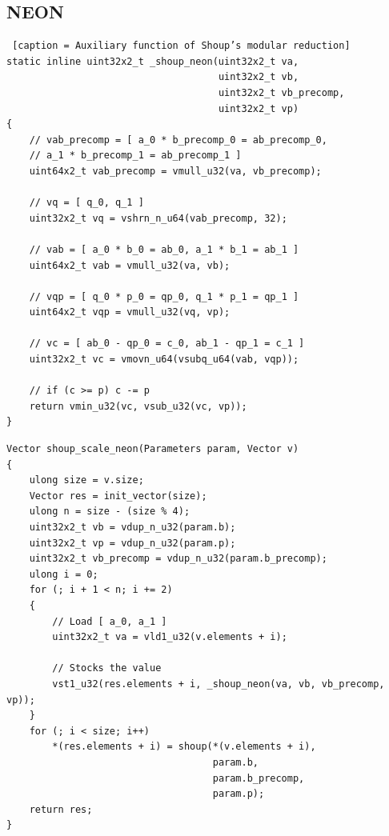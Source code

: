 \documentclass{article}
\begin{document}
\subsection{NEON}
\begin{lstlisting} [caption = Auxiliary function of Shoup’s modular reduction]
static inline uint32x2_t _shoup_neon(uint32x2_t va,
                                     uint32x2_t vb,
                                     uint32x2_t vb_precomp,
                                     uint32x2_t vp)
{
    // vab_precomp = [ a_0 * b_precomp_0 = ab_precomp_0,
    // a_1 * b_precomp_1 = ab_precomp_1 ]
    uint64x2_t vab_precomp = vmull_u32(va, vb_precomp);

    // vq = [ q_0, q_1 ]
    uint32x2_t vq = vshrn_n_u64(vab_precomp, 32);

    // vab = [ a_0 * b_0 = ab_0, a_1 * b_1 = ab_1 ]
    uint64x2_t vab = vmull_u32(va, vb);

    // vqp = [ q_0 * p_0 = qp_0, q_1 * p_1 = qp_1 ]
    uint64x2_t vqp = vmull_u32(vq, vp);

    // vc = [ ab_0 - qp_0 = c_0, ab_1 - qp_1 = c_1 ]
    uint32x2_t vc = vmovn_u64(vsubq_u64(vab, vqp));

    // if (c >= p) c -= p
    return vmin_u32(vc, vsub_u32(vc, vp));
}
\end{lstlisting}
\begin{lstlisting}[caption = NEON Implementation of Shoup’s Modular Reduction]
Vector shoup_scale_neon(Parameters param, Vector v)
{
    ulong size = v.size;
    Vector res = init_vector(size);
    ulong n = size - (size % 4);
    uint32x2_t vb = vdup_n_u32(param.b);
    uint32x2_t vp = vdup_n_u32(param.p);
    uint32x2_t vb_precomp = vdup_n_u32(param.b_precomp);
    ulong i = 0;
    for (; i + 1 < n; i += 2)
    {
        // Load [ a_0, a_1 ]
        uint32x2_t va = vld1_u32(v.elements + i);

        // Stocks the value
        vst1_u32(res.elements + i, _shoup_neon(va, vb, vb_precomp, vp));
    }
    for (; i < size; i++)
        *(res.elements + i) = shoup(*(v.elements + i),
                                    param.b,
                                    param.b_precomp,
                                    param.p);
    return res;
}
\end{lstlisting}
\end{document}
